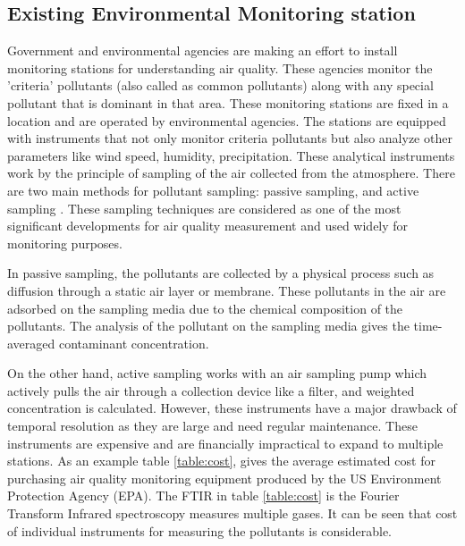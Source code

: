  
 \subsection{Existing Environmental Monitoring station}
 
 Government and environmental agencies are making an effort to install monitoring stations for understanding air quality. These agencies monitor the 'criteria' pollutants (also called as common pollutants) along with any special pollutant that is dominant in that area. These monitoring stations are fixed in a location and are operated by environmental agencies. The stations are equipped with instruments that not only monitor criteria pollutants but also analyze other parameters like wind speed, humidity, precipitation. These analytical instruments work by the principle of sampling of the air collected from the atmosphere.
 There are two main methods for pollutant sampling: passive sampling, and active sampling \cite{Balakrishnan2015}. These sampling techniques are considered as one of the most significant developments for air quality measurement and used widely for monitoring purposes. 
 
 \par
 
 In passive sampling, the pollutants are collected by a physical process such as diffusion through a static air layer or membrane. These pollutants in the air are adsorbed on the sampling media due to the chemical composition of the pollutants. The analysis of the pollutant on the sampling media gives the time-averaged contaminant concentration. %
 
 On the other hand, active sampling works with an air sampling pump which actively pulls the air through a collection device like a filter, and weighted concentration is calculated. However, these instruments have a major drawback of temporal resolution as they are large and need regular maintenance. These instruments are expensive and are financially impractical to expand to multiple stations. As an example table \ref{table:cost}, gives the average estimated cost for purchasing air quality monitoring equipment produced by the US Environment Protection Agency (EPA). The FTIR in table \ref{table:cost} is the Fourier Transform Infrared spectroscopy measures multiple gases. It can be seen that cost of individual instruments for measuring the pollutants is considerable. 

 \hspace{1 cm}
 
